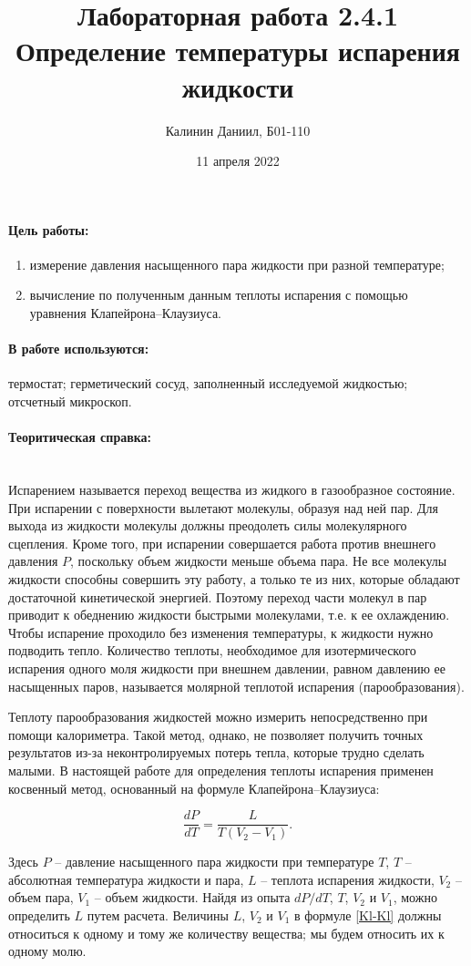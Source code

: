 \documentclass[a4paper, 12pt]{article}
\author{Калинин Даниил, Б01-110}
\date{11 апреля 2022}
\title{Лабораторная работа 2.4.1\\Определение температуры испарения жидкости}
\newcommand{\parag}[1]{\paragraph*{#1:}}
\begin{document}
\maketitle

\parag {Цель работы}
\begin{enumerate}
	\item измерение давления насыщенного пара жидкости при разной температуре;
	\item вычисление по полученным данным теплоты испарения с помощью уравнения Клапейрона–Клаузиуса.
\end{enumerate}

\parag {В работе используются}
термостат; герметический сосуд, заполненный исследуемой жидкостью; отсчетный микроскоп.

\parag {Теоритическая справка} ~\\
Испарением называется переход вещества из жидкого в газообразное состояние. При испарении с поверхности вылетают молекулы, образуя над ней пар. Для выхода из жидкости молекулы должны преодолеть силы молекулярного сцепления. Кроме того, при испарении совершается работа против внешнего давления $ P $, поскольку объем жидкости меньше объема пара. Не все молекулы жидкости способны совершить эту работу, а только те из них, которые обладают достаточной кинетической энергией. Поэтому переход части молекул в пар приводит к обеднению жидкости быстрыми молекулами, т.е. к ее охлаждению. Чтобы испарение проходило без изменения температуры, к жидкости нужно подводить тепло. Количество теплоты, необходимое для изотермического испарения одного моля жидкости при внешнем давлении, равном давлению ее насыщенных паров, называется молярной теплотой испарения (парообразования).

Теплоту парообразования жидкостей можно измерить непосредственно при помощи калориметра. Такой метод, однако, не позволяет получить точных результатов из-за неконтролируемых потерь тепла, которые трудно сделать малыми. В настоящей работе для определения теплоты испарения применен косвенный метод, основанный на формуле Клапейрона–Клаузиуса:

\begin{equation}\label{Kl-Kl}
\frac{dP}{dT}=\frac{L}{T\left(V_2-V_1\right)}.
\end{equation}

Здесь $ P $ -- давление насыщенного пара жидкости при температуре $ T $, $ T $ -- абсолютная температура жидкости и пара, $ L $ -- теплота испарения жидкости, $ V_2 $ -- объем пара, $ V_1 $ -- объем жидкости. Найдя из опыта $ dP/dT $, $ T $, $ V_2 $ и $ V_1 $, можно определить $ L $ путем расчета. Величины $ L $, $ V_2 $ и $ V_1 $ в формуле \eqref{Kl-Kl} должны относиться к одному и тому же количеству вещества; мы будем относить их к одному молю.
\end{document}

